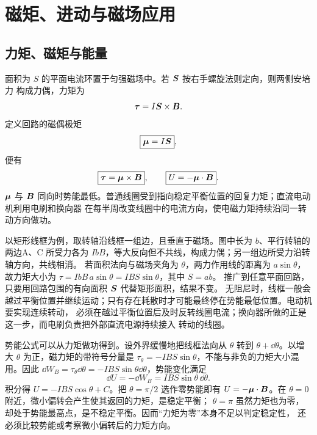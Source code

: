 {\section{磁矩、进动与磁场应用}

\subsection{力矩、磁矩与能量}


面积为 $S$ 的平面电流环置于匀强磁场中。若 $\bm{S}$ 按右手螺旋法则定向，则两侧安培力
构成力偶，力矩为
\begin{equation}
  \bm{\tau}=I\bm{S}\times\bm{B}.
\end{equation}
定义回路的磁偶极矩
\begin{equation}
  \boxed{\bm{\mu}=I\bm{S}},
\end{equation}
便有
\begin{equation}
  \boxed{\bm{\tau}=\bm{\mu}\times\bm{B}},
  \qquad
  \boxed{U=-\bm{\mu}\cdot\bm{B}}.
\end{equation}
$\bm{\mu}$ 与 $\bm{B}$ 同向时势能最低。普通线圈受到指向稳定平衡位置的回复力矩；直流电动机利用电刷和换向器
在每半周改变线圈中的电流方向，使电磁力矩持续沿同一转动方向做功。

以矩形线框为例，取转轴沿线框一组边，且垂直于磁场。图中长为 $b$、平行转轴的两边A、C
所受力各为 $IbB$，等大反向但不共线，构成力偶；另一组边所受力沿转轴方向，共线相消。
若面积法向与磁场夹角为 $\theta$，两力作用线的距离为 $a\sin\theta$，故力矩大小为
$\tau=IbB\,a\sin\theta=IBS\sin\theta$，其中 $S=ab$。
推广到任意平面回路，只要用回路包围的有向面积 $\bm{S}$ 代替矩形面积，结果不变。
无阻尼时，线框一般会越过平衡位置并继续运动；只有存在耗散时才可能最终停在势能最低位置。电动机要实现连续转动，
必须在越过平衡位置后及时反转线圈电流；换向器所做的正是这一步，而电刷负责把外部直流电源持续接入
转动的线圈。

势能公式可以从力矩做功得到。设外界缓慢地把线框法向从 $\theta$ 转到
$\theta+\dd\theta$。以增大 $\theta$ 为正，磁力矩的带符号分量是
$\tau_\theta=-IBS\sin\theta$，不能与非负的力矩大小混用。因此
$\dd W_B=\tau_\theta\dd\theta=-IBS\sin\theta\dd\theta$，势能变化满足
\begin{equation}
  \dd U=-\dd W_B=IBS\sin\theta\,\dd\theta.
\end{equation}
积分得 $U=-IBS\cos\theta+C$。把 $\theta=\pi/2$ 选作零势能即有
$U=-\bm{\mu}\cdot\bm{B}$。在 $\theta=0$ 附近，微小偏转会产生使其返回的力矩，是稳定平衡；
$\theta=\pi$ 虽然力矩也为零，却处于势能最高点，是不稳定平衡。因而“力矩为零”本身不足以判定稳定性，
还必须比较势能或考察微小偏转后的力矩方向。

}
